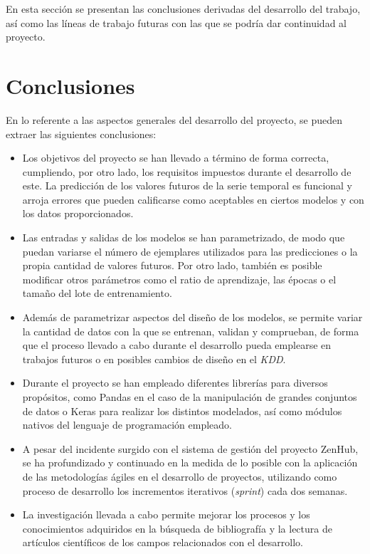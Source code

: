 En esta sección se presentan las conclusiones derivadas del desarrollo del trabajo, así como las
líneas de trabajo futuras con las que se podría dar continuidad al proyecto.

\section{Conclusiones}
En lo referente a las aspectos generales del desarrollo del proyecto, se pueden extraer las siguientes
conclusiones:
\begin{itemize}
    \item Los objetivos del proyecto se han llevado a término de forma correcta, cumpliendo,
        por otro lado, los requisitos impuestos durante el desarrollo de este. La predicción 
        de los valores futuros de la serie temporal es funcional y arroja errores que pueden
        calificarse como aceptables en ciertos modelos y con los datos proporcionados.
    \item Las entradas y salidas de los modelos se han parametrizado, de modo que puedan variarse
        el número de ejemplares utilizados para las predicciones o la propia cantidad de valores
        futuros. Por otro lado, también es posible modificar otros parámetros como el ratio de 
        aprendizaje, las épocas o el tamaño del lote de entrenamiento.
    \item Además de parametrizar aspectos del diseño de los modelos, se permite variar la cantidad
        de datos con la que se entrenan, validan y comprueban, de forma que el proceso llevado a cabo
        durante el desarrollo pueda emplearse en trabajos futuros o en posibles cambios de diseño
        en el \textit{KDD}.
    \item Durante el proyecto se han empleado diferentes librerías para diversos propósitos, como
        Pandas en el caso de la manipulación de grandes conjuntos de datos o Keras para realizar
        los distintos modelados, así como módulos nativos del lenguaje de programación empleado. 
    \item A pesar del incidente surgido con el sistema de gestión del proyecto ZenHub, se ha 
        profundizado y continuado en la medida de lo posible con la aplicación
        de las metodologías ágiles en el desarrollo de proyectos, utilizando como proceso de 
        desarrollo los incrementos iterativos (\textit{sprint}) cada dos semanas.
    \item La investigación llevada a cabo permite mejorar los procesos y los conocimientos adquiridos
        en la búsqueda de bibliografía y la lectura de artículos científicos de los campos relacionados
        con el desarrollo.
\end{itemize}

